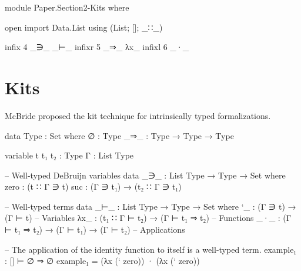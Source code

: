 \begin{code}[hide]
module Paper.Section2-Kits where

open import Data.List using (List; []; _∷_)

infix 4 _∋_ _⊢_
infixr 5 _⇒_ λx_
infixl 6 _·_
\end{code}

\newpage
\section{Kits}

McBride proposed the kit technique for intrinsically typed formalizations.

\begin{code}
data Type : Set where
  ∅    : Type
  _⇒_  : Type → Type → Type

variable
  t t₁ t₂  : Type
  Γ        : List Type

-- Well-typed DeBruijn variables
data _∋_ : List Type → Type → Set where
  zero  : (t ∷ Γ ∋ t)
  suc   : (Γ ∋ t₁) → (t₂ ∷ Γ ∋ t₁)

-- Well-typed terms
data _⊢_ : List Type → Type → Set where
  `_   : (Γ ∋ t) → (Γ ⊢ t)                    -- Variables
  λx_  : (t₁ ∷ Γ ⊢ t₂) → (Γ ⊢ t₁ ⇒ t₂)        -- Functions
  _·_  : (Γ ⊢ t₁ ⇒ t₂) → (Γ ⊢ t₁) → (Γ ⊢ t₂)  -- Applications

-- The application of the identity function to itself is a well-typed term.
example₁ : [] ⊢ ∅ ⇒ ∅
example₁ = (λx (` zero)) · (λx (` zero))
\end{code}
